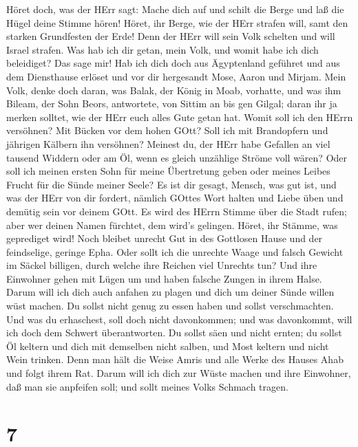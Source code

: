  Höret doch, was der HErr sagt: Mache dich auf und schilt
die Berge und laß die Hügel deine Stimme hören!  Höret, ihr
Berge, wie der HErr strafen will, samt den starken Grundfesten der Erde!
Denn der HErr will sein Volk schelten und will Israel strafen.
 Was hab ich dir getan, mein Volk, und womit habe ich dich
beleidiget? Das sage mir!  Hab ich dich doch aus Ägyptenland
geführet und aus dem Diensthause erlöset und vor dir hergesandt Mose,
Aaron und Mirjam.  Mein Volk, denke doch daran, was Balak,
der König in Moab, vorhatte, und was ihm Bileam, der Sohn Beors,
antwortete, von Sittim an bis gen Gilgal; daran ihr ja merken solltet,
wie der HErr euch alles Gute getan hat.  Womit soll ich den
HErrn versöhnen? Mit Bücken vor dem hohen GOtt? Soll ich mit Brandopfern
und jährigen Kälbern ihn versöhnen?  Meinest du, der HErr
habe Gefallen an viel tausend Widdern oder am Öl, wenn es gleich
unzählige Ströme voll wären? Oder soll ich meinen ersten Sohn für meine
Übertretung geben oder meines Leibes Frucht für die Sünde meiner Seele?
 Es ist dir gesagt, Mensch, was gut ist, und was der HErr
von dir fordert, nämlich GOttes Wort halten und Liebe üben und demütig
sein vor deinem GOtt.  Es wird des HErrn Stimme über die
Stadt rufen; aber wer deinen Namen fürchtet, dem wird's gelingen. Höret,
ihr Stämme, was geprediget wird!  Noch bleibet unrecht Gut
in des Gottlosen Hause und der feindselige, geringe Epha. 
Oder sollt ich die unrechte Waage und falsch Gewicht im Säckel billigen,
 durch welche ihre Reichen viel Unrechts tun? Und ihre
Einwohner gehen mit Lügen um und haben falsche Zungen in ihrem Halse.
 Darum will ich dich auch anfahen zu plagen und dich um
deiner Sünde willen wüst machen.  Du sollst nicht genug zu
essen haben und sollst verschmachten. Und was du erhaschest, soll doch
nicht davonkommen; und was davonkommt, will ich doch dem Schwert
überantworten.  Du sollst säen und nicht ernten; du sollst
Öl keltern und dich mit demselben nicht salben, und Most keltern und
nicht Wein trinken.  Denn man hält die Weise Amris und alle
Werke des Hauses Ahab und folgt ihrem Rat. Darum will ich dich zur Wüste
machen und ihre Einwohner, daß man sie anpfeifen soll; und sollt meines
Volks Schmach tragen.

\hypertarget{section-6}{%
\section{7}\label{section-6}}

